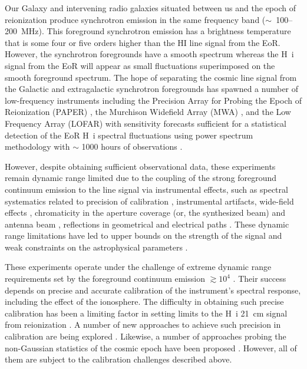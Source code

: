 \documentclass[
reprint,
superscriptaddress,
amsmath,
amssymb,
aps,
prd
]{revtex4-1}
\begin{document}
Our Galaxy and intervening radio galaxies situated between us and the epoch of reionization produce synchrotron emission in the same frequency band ($\sim$~100--200~MHz). This foreground synchrotron emission has a brightness temperature that is some four or five orders higher than the HI line signal from the EoR. However, the synchrotron foregrounds have a smooth spectrum whereas the H~{\sc i} signal from the EoR will appear as small fluctuations superimposed on the smooth foreground spectrum. The hope of separating the cosmic line signal from the Galactic and extragalactic synchrotron foregrounds has spawned a number of low-frequency instruments including the Precision Array for Probing the Epoch of Reionization (PAPER) \cite{par10}, the Murchison Widefield Array (MWA) \cite{tin13}, and the Low Frequency Array (LOFAR) \cite{van13} with sensitivity forecasts sufficient for a statistical detection of the EoR H~{\sc i} spectral fluctuations using power spectrum methodology with $\sim$ 1000 hours of observations \cite{bea13,thy13}. 

However, despite obtaining sufficient observational data, these experiments remain dynamic range limited due to the coupling of the strong foreground continuum emission to the line signal via instrumental effects, such as spectral systematics related to precision of calibration \cite{barry16}, instrumental artifacts, wide-field effects \cite{thy15a,thy15b}, chromaticity in the aperture coverage (or, the synthesized beam) and antenna beam \cite{thy16}, reflections in geometrical and electrical paths \cite{thy16}. These dynamic range limitations have led to upper bounds on the strength of the signal \cite{pac13,ali15,patil17} and weak constraints on the astrophysical parameters \cite{pob15}. 

These experiments operate under the challenge of extreme dynamic range requirements set by the foreground continuum emission $\gtrsim 10^4$ \cite{dim02,ali08,ber09,ber10,dat10,gho12}. Their success depends on precise and accurate calibration of the instrument's spectral response, including the effect of the ionosphere. The difficulty in obtaining such precise calibration \cite[for e.g.,][]{dat09,barry16,tro16} has been a limiting factor in setting limits to the H~{\sc i} 21~cm signal from reionization \cite{ali15,patil16,patil17}. A number of new approaches to achieve such precision in calibration are being explored \cite{liu10,zhe14,sie17,dil17}. Likewise, a number of approaches probing the non-Gaussian statistics of the cosmic epoch have been proposed \cite{lid07,bar08,harker09,wat14,kit16,ali06,son15,shi16,maj17}. However, all of them are subject to the calibration challenges described above. 
\end{document}
